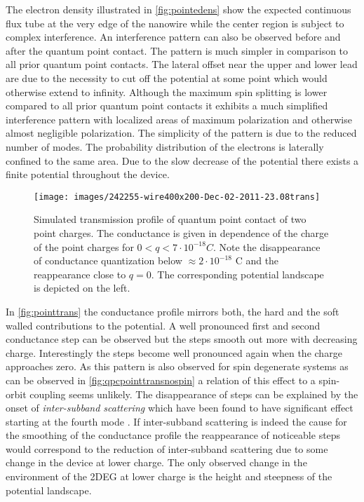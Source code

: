 The electron density illustrated in \cref{fig:pointedens} show the expected continuous flux tube at the very edge of the nanowire while the center region is subject to complex interference. An interference pattern can also be observed before and after the quantum point contact. The pattern is much simpler in comparison to all prior quantum point contacts. The lateral offset near the upper and lower lead are due to the necessity to cut off the potential at some point which would otherwise extend to infinity.
Although the maximum spin splitting is lower compared to all prior quantum point contacts it exhibits a much simplified interference pattern with localized areas of maximum polarization and otherwise almost negligible polarization. The simplicity of the pattern is due to the reduced number of modes. The probability distribution of the electrons is laterally confined to the same area. Due to the slow decrease of the potential there exists a finite potential throughout the device.\par
\begin{figure}[h]
\centering
\texttt{[image: images/242255-wire400x200-Dec-02-2011-23.08trans]}
\caption{Simulated transmission profile of quantum point contact of two point charges. The conductance is given in dependence of the charge of the point charges for $0 < q <7\cdot 10^{-18} C$. Note the disappearance of conductance quantization below $\approx 2\cdot10^{-18}$ C and the reappearance close to $q=0$. The corresponding potential landscape is depicted on the left.}\label{fig:qpcpointtransspin}
\end{figure}
In \cref{fig:pointtrans} the conductance profile mirrors both, the hard and the soft walled contributions to the potential. A well pronounced first and second conductance step can be observed but the steps smooth out more with decreasing charge. Interestingly the steps become well pronounced again when the charge approaches zero. As this pattern is also observed for spin degenerate systems as can be observed in \cref{fig:qpcpointtransnospin} a relation of this effect to a spin-orbit coupling seems unlikely. 
The disappearance of steps can be explained by the onset of \emph{inter-subband scattering} which have been found to have significant effect starting at the fourth mode \cite{Lehmann2011}. If inter-subband scattering is indeed the cause for the smoothing of the conductance profile the reappearance of noticeable steps would correspond to the reduction of inter-subband scattering due to some change in the device at lower charge. The only observed change in the environment of the 2DEG at lower charge is the height and steepness of the potential landscape.
